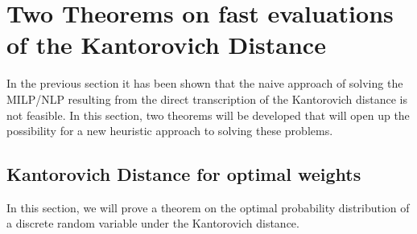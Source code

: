 \section{Two Theorems on fast evaluations of the Kantorovich Distance}
\label{sec:two-theorems}
In the previous section it has been shown that the naive approach of solving the MILP/NLP resulting from the direct transcription of the Kantorovich distance is not feasible.
In this section, two theorems will be developed that will open up the possibility for a new heuristic approach to solving these problems.
\subsection{Kantorovich Distance for optimal weights}
\label{sec:optimal-weights-proof}
In this section, we will prove a theorem on the optimal probability distribution of a discrete random variable under the Kantorovich distance.


